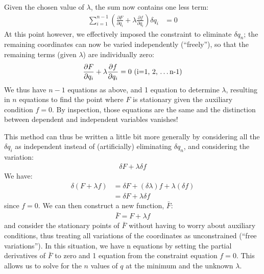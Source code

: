 Given the chosen value of $\lambda$, the sum now contains one less term:
\begin{align}
\sum_{i=1}^{n-1} \left(\frac{\partial F}{\partial q_i}+ \lambda \frac{\partial f}{\partial q_i}\right)\delta q_i&=0
\end{align}
At this point however, we effectively imposed the constraint to eliminate $\delta q_n$; the remaining coordinates can now be varied independently (``freely''), so that the remaining terms (given $\lambda$) are individually zero:
\begin{align}
\frac{\partial F}{\partial q_i}+ \lambda \frac{\partial f}{\partial q_i}=0 \text{       (i=1, 2, \dots n-1)}
\end{align}
We thus have $n-1$ equations as above, and 1 equation to determine $\lambda$, resulting in $n$ equations to find the point where $F$ is stationary given the auxiliary condition $f=0$. By inspection, those equations are the same and the distinction between dependent and independent variables vanishes!

This method can thus be written a little bit more generally by considering all the $\delta q_i$ as independent instead of (artificially) eliminating $\delta q_n$, and considering the variation:
\begin{align}
\delta F + \lambda \delta f
\end{align}
We have:
\begin{align}
\delta (F+\lambda f) &= \delta F+ (\delta \lambda) f + \lambda (\delta f)\nonumber\\
&=\delta F + \lambda \delta f
\end{align}
since $f=0$. We can then construct a new function, $\bar{F}$:
\begin{align}
\bar{F}=F + \lambda f
\end{align}
and consider the stationary points of $\bar{F}$ without having to worry about auxiliary conditions, thus treating all variations of the coordinates as unconstrained (``free variations''). In this situation, we have n equations by setting the partial derivatives of $\bar{F}$ to zero and 1 equation from the constraint equation $f=0$. This allows us to solve for the $n$ values of $q$ at the minimum and the unknown $\lambda$.

